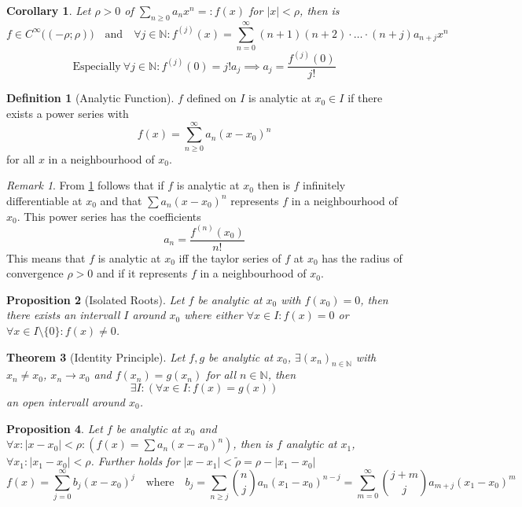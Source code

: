 \documentclass[english,titlepage]{uzhpub}
\theoremstyle{definition}
\newtheorem{definition}{Definition}[section]
\theoremstyle{plain}
\newtheorem{proposition}[definition]{Proposition}
\newtheorem{theorem}[definition]{Theorem} %
\newtheorem{corollary}{Corollary}[theorem]
\theoremstyle{remark}
\newtheorem*{remark}{Remark}
\theoremstyle{example}
\begin{document}
   \begin{corollary}\label{cor:termwise_derivative}
      Let \(\rho > 0\) of \(\sum_{n \geq 0} a_n x^n =: f(x)\) for \(|x| < \rho\), then is
      \[f \in C^\infty\big((-\rho; \rho)\big) \quad\text{and}\quad \forall j \in \mathbb{N}: f^{(j)}(x) = \sum_{n=0}^\infty (n+1)(n+2) \cdot \ldots \cdot (n+j)a_{n+j}x^n\]
      \[\text{Especially}~\forall j \in \mathbb{N}: f^{(j)}(0) = j!a_j \implies a_j = \frac{f^{(j)}(0)}{j!}\]
   \end{corollary}

   \begin{definition}[Analytic Function]
      \(f\) defined on \(I\) is analytic at \(x_0 \in I\) if there exists a power series with
      \[f(x) = \sum_{n \geq 0}^\infty a_n(x - x_0)^n\]
      for all \(x\) in a neighbourhood of \(x_0\).
   \end{definition}
   \begin{remark}
      From \cref{cor:termwise_derivative} follows that if \(f\) is analytic at \(x_0\) then is \(f\) infinitely differentiable at \(x_0\) and that \(\sum a_n(x - x_0)^n\) represents \(f\) in a neighbourhood of \(x_0\).
      This power series has the coefficients
      \[a_n = \frac{f^{(n)}(x_0)}{n!}\]
      This means that \(f\) is analytic at \(x_0\) iff the taylor series of \(f\) at \(x_0\) has the radius of convergence \(\rho > 0\) and if it represents \(f\) in a neighbourhood of \(x_0\).
   \end{remark}

   \begin{proposition}[Isolated Roots]\label{pro:isolated_roots}
      Let \(f\) be analytic at \(x_0\) with \(f(x_0) = 0\), then there exists an intervall \(I\) around \(x_0\) where either \(\forall x \in I: f(x) = 0\) or \(\forall x \in I \setminus \{0\}: f(x) \neq 0\).
   \end{proposition}

   \begin{theorem}[Identity Principle]\label{thm:identiy_principle}
      Let \(f, g\) be analytic at \(x_0\), \(\exists (x_n)_{n \in \mathbb{N}}\) with \(x_n \neq x_0\), \(x_n \to x_0\) and \(f(x_n) = g(x_n)\) for all \(n \in \mathbb{N}\), then
      \[\exists I: (\forall x \in I: f(x) = g(x))\]
      an open intervall around \(x_0\).
   \end{theorem}

   \begin{proposition}
      Let \(f\) be analytic at \(x_0\) and \(\forall x: |x-x_0| < \rho: (f(x) = \sum a_n(x-x_0)^n)\), then is \(f\) analytic at \(x_1\), \(\forall x_1: |x_1 - x_0| < \rho\).
      Further holds for \(|x - x_1| < \widetilde{\rho} = \rho - |x_1 - x_0|\)
      \[f(x) = \sum_{j=0}^\infty b_j (x - x_0)^j \quad\text{where}\quad b_j = \sum_{n \geq j} \binom{n}{j}a_n(x_1 - x_0)^{n-j} = \sum_{m=0}^\infty \binom{j+m}{j} a_{m+j}(x_1 - x_0)^m\]
   \end{proposition}
\end{document}

